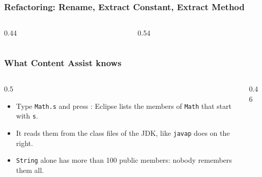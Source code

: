 \documentclass[aspectratio=169,10pt,compress]{beamer}
\begin{document}
\begin{frame}[t,fragile] \frametitle{Refactoring: Rename, Extract Constant, Extract Method}
  \begin{columns}[T]
    \begin{column}{0.44\textwidth}
    \end{column}
    \begin{column}{0.54\textwidth}
    \end{column}
  \end{columns}
\end{frame}





\begin{frame}[t,fragile] \frametitle{What Content Assist knows}
  \begin{columns}[T]
    \begin{column}{0.5\textwidth}
      \begin{itemize}\small
        \item Type \texttt{Math.s} and press : Eclipse lists the members of \texttt{Math} that start with \texttt{s}.
        \item It reads them from the class files of the JDK, like \texttt{javap} does on the right.
        \item \texttt{String} alone has more than 100 public members: nobody remembers them all.
      \end{itemize}
    \end{column}
    \begin{column}{0.46\textwidth}
    \end{column}
  \end{columns}
\end{frame}

\end{document}
